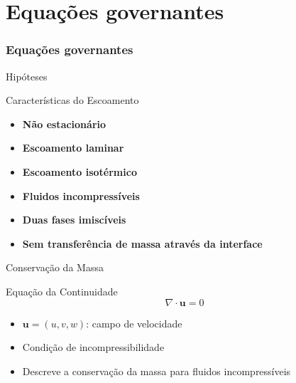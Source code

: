 \documentclass[../main/main.tex]{subfiles}
\begin{document}
\section{Equações governantes}

\begin{frame}
  \frametitle{Equações governantes}
\end{frame}


\begin{frame}{Hipóteses}
  \begin{block}{Características do Escoamento}
    \begin{itemize}
      \item \textbf{Não estacionário}
      \item \textbf{Escoamento laminar}
      \item \textbf{Escoamento isotérmico}
      \item \textbf{Fluidos incompressíveis}
      \item \textbf{Duas fases imiscíveis}
      \item \textbf{Sem transferência de massa através da interface}
    \end{itemize}
  \end{block}
\end{frame}

\begin{frame}{Conservação da Massa}
  \begin{block}{Equação da Continuidade}
    \[
      \nabla \cdot \mathbf{u} = 0
    \]
  \end{block}
  \vspace{0.5cm}
  \begin{itemize}
    \item $\mathbf{u} = (u, v, w)$: campo de velocidade
    \item Condição de incompressibilidade
    \item Descreve a conservação da massa para fluidos incompressíveis
  \end{itemize}
\end{frame}
\end{document}
